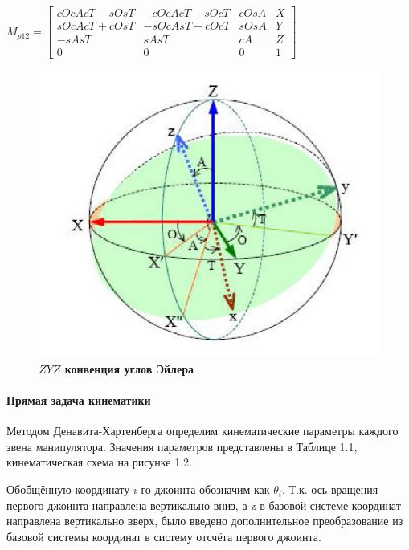 \documentclass[a4paper,14pt,russian]{extreport} \usepackage{extsizes}
\begin{document}
	${M_{p12}}=\begin{bmatrix} 
	cOcAcT-sOsT & -cOcAcT-sOcT & cOsA & X \\ 
	sOcAcT+cOsT & -sOcAsT+cOcT & sOsA & Y\\
	-sAsT & sAsT & cA & Z \\
	0 & 0 & 0 & 1
	\end{bmatrix}$ 
	
	\begin{figure}[h!]
		\centering		 
		\includegraphics[width=6in]{./img/img21.JPG}	
		\caption{
		\textbf{$ZYZ$ конвенция углов Эйлера
			}     
		}
		\label{fig_img13}
	\end{figure}	
	\paragraph{Прямая задача кинематики}
	Методом Денавита-Хартенберга определим кинематические параметры каждого звена манипулятора. Значения параметров представлены в Таблице 1.1, кинематическая схема на рисунке 1.2. 
	
	Обобщённую координату $i$-го джоинта обозначим как $\theta_{i}$.
	Т.к. ось вращения первого джоинта направлена вертикально вниз, а z в базовой системе координат направлена вертикально вверх, было введено дополнительное преобразование из базовой системы координат в систему отсчёта первого джоинта.
	
\end{document}
